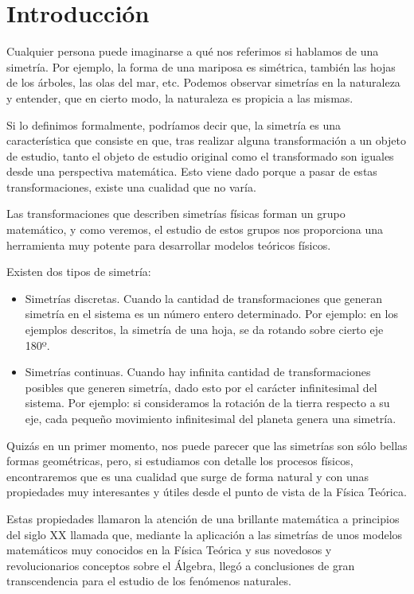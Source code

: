 \section{Introducción}\label{sec:introduccion}

Cualquier persona puede imaginarse a qué nos referimos si hablamos de una simetría. Por ejemplo, la forma de una mariposa es simétrica, también las hojas de los árboles, las olas del mar, etc. Podemos observar simetrías en la naturaleza y entender, que en cierto modo, la naturaleza es propicia a las mismas.

Si lo definimos formalmente, podríamos decir que, la simetría es una característica que consiste en que, tras realizar alguna transformación a un objeto de estudio, tanto el objeto de estudio original como el transformado son iguales desde una perspectiva matemática. Esto viene dado porque a pasar de estas transformaciones, existe una cualidad que no varía.

Las transformaciones que describen simetrías físicas forman un grupo matemático, y como veremos, el estudio de estos grupos nos proporciona una herramienta muy potente para desarrollar modelos teóricos físicos.

Existen dos tipos de simetría:
\begin{itemize}
    \item Simetrías discretas. Cuando la cantidad de transformaciones que generan simetría en el sistema es un número entero determinado. Por ejemplo: en los ejemplos descritos, la simetría de una hoja, se da rotando sobre cierto eje 180º.
    \item Simetrías continuas. Cuando hay infinita cantidad de transformaciones posibles que generen simetría, dado esto por el carácter infinitesimal del sistema. Por ejemplo: si consideramos la rotación de la tierra respecto a su eje, cada pequeño movimiento infinitesimal del planeta genera una simetría.
\end{itemize}

Quizás en un primer momento, nos puede parecer que las simetrías son sólo bellas formas geométricas, pero, si estudiamos con detalle los procesos físicos, encontraremos que es una cualidad que surge de forma natural y con unas propiedades muy interesantes y útiles desde el punto de vista de la Física Teórica.

Estas propiedades llamaron la atención de una brillante matemática a principios del siglo XX llamada  que, mediante la aplicación a las simetrías de unos modelos matemáticos muy conocidos en la Física Teórica y sus novedosos y revolucionarios conceptos sobre el Álgebra, llegó a conclusiones de gran transcendencia para el estudio de los fenómenos naturales.

